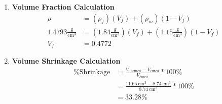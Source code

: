\setcounter{equation}{0}

\begin{enumerate}
    \item \textbf{Volume Fraction Calculation}
        \vspace{-0.25in}
        \begin{align*}
            \rho &= (\rho_{f})(V_{f}) + (\rho_{m})(1-V_{f}) \\
            1.4793 \frac{\text{g}}{\text{cm}^3} &= (1.84 \frac{\text{g}}{\text{cm}^3})(V_{f}) + (1.15 \frac{\text{g}}{\text{cm}^3})(1-V_{f}) \\
            V_{f} &= 0.4772
        \end{align*}
    \item \textbf{Volume Shrinkage Calculation}
        \vspace{-0.25in}
        \begin{align*}
            \% \text{Shrinkage} &= \frac{V_\text{uncured} - V_\text{cured}}{V_\text{cured}} * 100 \% \\
            &= \frac{11.65 \: \text{cm}^{3} - 8.74 \: \text{cm}^3}{8.74 \: \text{cm}^3} * 100 \% \\
            &= 33.28 \%
        \end{align*}
        
            

\end{enumerate}












